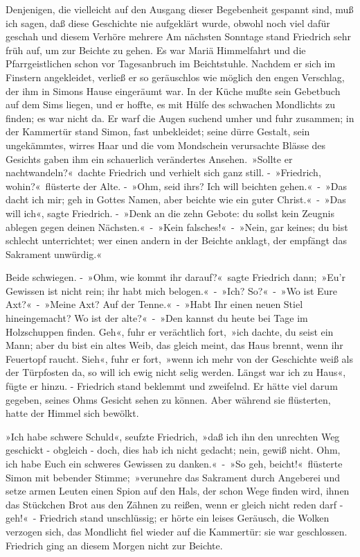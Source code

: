Denjenigen, die vielleicht auf den Ausgang dieser Begebenheit gespannt sind, muß ich sagen, daß diese Geschichte nie aufgeklärt wurde, obwohl noch viel dafür geschah und diesem Verhöre mehrere
Am nächsten Sonntage stand Friedrich sehr früh auf, um zur Beichte zu gehen. Es war Mariä Himmelfahrt und die Pfarrgeistlichen schon vor Tagesanbruch im Beichtstuhle. Nachdem er sich im Finstern angekleidet, verließ er so geräuschlos wie möglich den engen Verschlag, der ihm in Simons Hause eingeräumt war. In der Küche mußte sein Gebetbuch auf dem Sims liegen, und er hoffte, es mit Hülfe des schwachen Mondlichts zu finden; es war nicht da. Er warf die Augen suchend umher und fuhr zusammen; in der Kammertür stand Simon, fast unbekleidet; seine dürre Gestalt, sein ungekämmtes, wirres Haar und die vom Mondschein verursachte Blässe des Gesichts gaben ihm ein schauerlich verändertes Ansehen. »Sollte er nachtwandeln?« dachte Friedrich und verhielt sich ganz still. - »Friedrich, wohin?« flüsterte der Alte. - »Ohm, seid ihrs? Ich will beichten gehen.« - »Das dacht ich mir; geh in Gottes Namen, aber beichte wie ein guter Christ.« - »Das will ich«, sagte Friedrich. - »Denk an die zehn Gebote: du sollst kein Zeugnis ablegen gegen deinen Nächsten.« - »Kein falsches!« - »Nein, gar keines; du bist schlecht unterrichtet; wer einen andern in der Beichte anklagt, der empfängt das Sakrament unwürdig.«

Beide schwiegen. - »Ohm, wie kommt ihr darauf?« sagte Friedrich dann; »Eu’r Gewissen ist nicht rein; ihr habt mich belogen.« - »Ich? So?« - »Wo ist Eure Axt?« - »Meine Axt? Auf der Tenne.« - »Habt Ihr einen neuen Stiel hineingemacht? Wo ist der alte?« - »Den kannst du heute bei Tage im Holzschuppen finden. Geh«, fuhr er verächtlich fort, »ich dachte, du seist ein Mann; aber du bist ein altes Weib, das gleich meint, das Haus brennt, wenn ihr Feuertopf raucht. Sieh«, fuhr er fort, »wenn ich mehr von der Geschichte weiß als der Türpfosten da, so will ich ewig nicht selig werden. Längst war ich zu Haus«, fügte er hinzu. - Friedrich stand beklemmt und zweifelnd. Er hätte viel darum gegeben, seines Ohms Gesicht sehen zu können. Aber während sie flüsterten, hatte der Himmel sich bewölkt.

»Ich habe schwere Schuld«, seufzte Friedrich, »daß ich ihn den unrechten Weg geschickt - obgleich - doch, dies hab ich nicht gedacht; nein, gewiß nicht. Ohm, ich habe Euch ein schweres Gewissen zu danken.« - »So geh, beicht!« flüsterte Simon mit bebender Stimme; »verunehre das Sakrament durch Angeberei und setze armen Leuten einen Spion auf den Hals, der schon Wege finden wird, ihnen das Stückchen Brot aus den Zähnen zu reißen, wenn er gleich nicht reden darf - geh!« - Friedrich stand unschlüssig; er hörte ein leises Geräusch, die Wolken verzogen sich, das Mondlicht fiel wieder auf die Kammertür: sie war geschlossen. Friedrich ging an diesem Morgen nicht zur Beichte.

